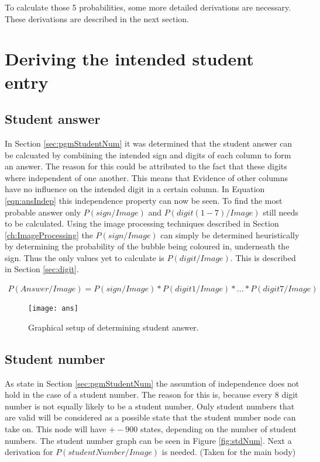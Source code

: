 To calculate those 5 probabilities, some more detailed derivations are necessary. These derivations are described in the next section.

\section{Deriving the intended student entry}

\subsection{Student answer}

In Section \ref{sec:pgmStudentNum} it was determined that the student answer can be calcuated by combiining the intended sign and digits of each column to form an answer. The reason for this could be attributed to the fact that these digits where independent of one another. This means that Evidence of other columns have no influence on the intended digit in a certain column. In Equation \ref{eqn:ansIndep} this independence property can now be seen. To find the most probable answer only $P(sign/Image)$ and $P(digit(1-7)/Image)$ still needs to be calculated. Using the image processing techniques described in Section \ref{ch:ImageProcessing} the $P(sign/Image)$ can simply be determined heuristically by determining the probability of the bubble being coloured in, underneath the sign. Thus the only values yet to calculate is $P(digit/Image)$. This is described in Section \ref{sec:digit}.

\begin{align}
  P(Answer/Image) =  P(sign/Image)*P(digit1/Image)*...*P(digit7/Image)
\label{eqn:ansIndep}
\end{align}

\begin{figure}
  \centering
  \texttt{[image: ans]}\\
  \caption{Graphical setup of determining student answer.}
  \label{fig:ans}
\end{figure}

\subsection{Student number}

As state in Section \ref{sec:pgmStudentNum} the assumtion of independence does not hold in the case of a student number. The reason for this is, because every 8 digit number is not equally likely to be a student number. Only student numbers that are valid will be considered as a possible state that the student number node can take on. This node will have $+- 900$ states, depending on the number of student numbers. The student number graph can be seen in Figure \ref{fig:stdNum}. Next a derivation for $P(studentNumber/Image)$ is needed. (Taken for the main body) 


